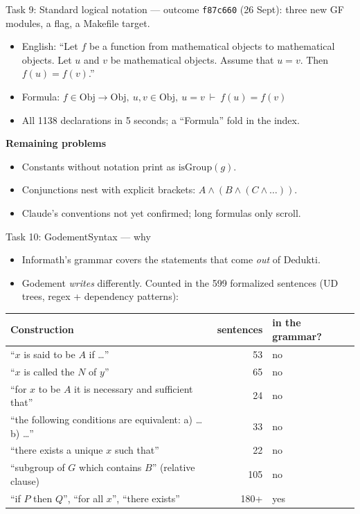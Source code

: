 \documentclass[10pt,aspectratio=169]{beamer}
\newcommand{\bad}[1]{\textcolor{warn}{#1}}
\newcommand{\ok}[1]{\textcolor{good}{#1}}
\newcommand{\commit}[1]{\texttt{\footnotesize #1}}
\begin{document}
\begin{frame}{Task 9: Standard logical notation --- outcome}
  \commit{f87c660} (26 Sept): three new GF modules, a flag, a Makefile target.
  \begin{itemize}\small
    \item English: ``Let $f$ be a function from mathematical objects to mathematical
          objects. Let $u$ and $v$ be mathematical objects. Assume that $u = v$.
          Then $f(u) = f(v)$.''
    \item Formula: \quad $f \in \mathrm{Obj} \to \mathrm{Obj},\ u, v \in \mathrm{Obj},\ u = v
          \ \vdash\ f(u) = f(v)$
    \item All 1138 declarations in 5 seconds; a ``Formula'' fold in the index.
  \end{itemize}
  \textbf{Remaining problems}
  \begin{itemize}\small
    \item Constants without notation print as $\mathrm{isGroup}(g)$.
    \item Conjunctions nest with explicit brackets: $A \land (B \land (C \land \dots))$.
    \item Claude's conventions not yet confirmed; long formulas only scroll.
  \end{itemize}
\end{frame}

\begin{frame}{Task 10: GodementSyntax --- why}
  \begin{itemize}
    \item Informath's grammar covers the statements that come \emph{out} of Dedukti.
    \item Godement \emph{writes} differently. Counted in the 599 formalized sentences
          (UD trees, regex + dependency patterns):
  \end{itemize}
  \begin{center}\footnotesize
  \begin{tabular}{lrl}
    \toprule
    \textbf{Construction} & \textbf{sentences} & \textbf{in the grammar?} \\
    \midrule
    ``$x$ is said to be $A$ if \dots'' & 53 & \bad{no} \\
    ``$x$ is called the $N$ of $y$'' & 65 & \bad{no} \\
    ``for $x$ to be $A$ it is necessary and sufficient that'' & 24 & \bad{no} \\
    ``the following conditions are equivalent: a) \dots{} b) \dots'' & 33 & \bad{no} \\
    ``there exists a unique $x$ such that'' & 22 & \bad{no} \\
    ``subgroup of $G$ which contains $B$'' (relative clause) & 105 & \bad{no} \\
    ``if $P$ then $Q$'', ``for all $x$'', ``there exists'' & 180+ & \ok{yes} \\
    \bottomrule
  \end{tabular}
  \end{center}
\end{frame}
\end{document}
